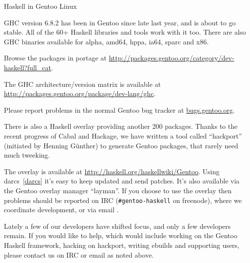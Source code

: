 \begin{hcarentry}[updated]{Haskell in Gentoo Linux}
\label{gentoo}
\makeheader

GHC version 6.8.2 has been in Gentoo since late last year, and is about to
go stable. All of the 60+ Haskell libraries and tools work with it too. 
There are also GHC binaries available for alpha, amd64, hppa, ia64, sparc
and x86.

Browse the packages in portage at 
\url{http://packages.gentoo.org/category/dev-haskell?full\_cat}.

The GHC architecture/version matrix is available at
\url{http://packages.gentoo.org/package/dev-lang/ghc}.

Please report problems in the normal Gentoo bug tracker
at \url{bugs.gentoo.org}.

There is also a Haskell overlay providing another 200 packages. Thanks to
the recent progress of Cabal and Hackage, we have written a tool called
``hackport'' (initiated by Henning G\"unther) to generate Gentoo packages,
that rarely need much tweeking.

The overlay is available at
\url{http://haskell.org/haskellwiki/Gentoo}. Using
darcs~\cref{darcs} it's easy to keep updated and send patches.
It's also available via the Gentoo overlay manager ``layman''.
If you choose to use the overlay then problems should be
reported on
IRC (\verb+#gentoo-haskell+ on freenode), where we coordinate
development, or via email .

Lately a few of our developers have shifted focus, and only a few
developers remain. If you would like to help, which would include
working on the Gentoo Haskell framework, hacking on hackport, writing
ebuilds and supporting users, please contact us on IRC or email as noted
above.
\end{hcarentry}
